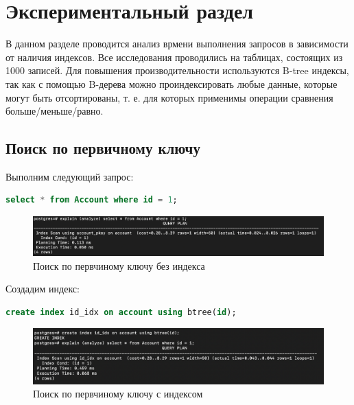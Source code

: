 \chapter{Экспериментальный раздел}
В данном разделе проводится анализ врмени выполнения запросов в зависимости от наличия индексов. Все исследования проводились на таблицах, состоящих из 1000 записей. Для повышения производительности используются B-tree индексы, так как с помощью B-дерева можно проиндексировать любые данные, которые могут быть отсортированы, т. е. для которых применимы операции сравнения больше/меньше/равно.

\section{Поиск по первичному ключу}
Выполним следующий запрос:
\begin{lstlisting}[label=lst:pk_1, caption=Запрос поиска по первичному ключу, language=sql]
select * from Account where id = 1;
\end{lstlisting}

\begin{figure}[h!]
	\begin{center}
		\includegraphics[width = \linewidth]{img/pk.png}
	\end{center}
	\captionsetup{justification=centering}
	\caption{Поиск по первчиному ключу без индекса}
	\label{img:get-example}
\end{figure}

Создадим индекс:

\begin{lstlisting}[label=lst:pk_1, caption=Создание индекса для поиска по первичному ключу, language=sql]
create index id_idx on account using btree(id);
\end{lstlisting}

\begin{figure}[h!]
	\begin{center}
		\includegraphics[width = \linewidth]{img/pk_idx.png}
	\end{center}
	\captionsetup{justification=centering}
	\caption{Поиск по первчиному ключу с индексом}
	\label{img:get-example}
\end{figure}

